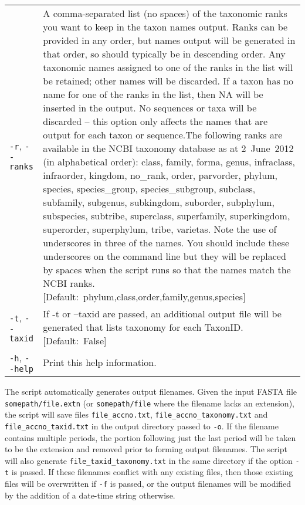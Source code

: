 \documentclass[11pt]{amsart}
\begin{document}
\begin{longtable}{@{} p{1.4in} p{5.35in} @{}}
      \verb|-r|, \verb|--ranks|  & A comma-separated list (no spaces) of the taxonomic ranks you want to keep in the taxon names output. Ranks can be provided in any order, but names output will be generated in that order, so should typically be in descending order. Any taxonomic names assigned to one of the ranks in the list will be retained; other names will be discarded. If a taxon has no name for one of the ranks in the list, then NA will be inserted in the output. No sequences or taxa will be discarded -- this option only affects the names that are output for each taxon or sequence.The following ranks are available in the NCBI taxonomy database as at 2~June~2012 (in alphabetical order): class, family, forma, genus, \mbox{infraclass}, \mbox{infraorder}, kingdom, no\_rank, order, parvorder, phylum, species, species\_group, species\_subgroup, subclass, subfamily, subgenus, \mbox{subkingdom}, \mbox{suborder}, \mbox{subphylum}, subspecies, subtribe, superclass, superfamily, \mbox{superkingdom}, \mbox{superorder}, superphylum, tribe, varietas. Note the use of underscores in three of the names. You should include these underscores on the command line but they will be replaced by spaces when the script runs so that the names match the NCBI ranks. \mbox{[Default:~phylum,class,order,family,genus,species]} \\
      \verb|-t|, \verb|--taxid| & If -t or --taxid are passed, an additional output file will be generated that lists taxonomy for each TaxonID.  \mbox{[Default:~False]}	\\
      \verb|-h|, \verb|--help| & Print this help information.
\end{longtable}

The script automatically generates output filenames. Given the input FASTA file \verb|somepath/file.extn| (or \verb|somepath/file| where the filename lacks an extension), the script will save files \verb|file_accno.txt|, \verb|file_accno_taxonomy.txt| and \verb|file_accno_taxid.txt| in the output directory passed to \verb|-o|. If the filename contains multiple periods, the portion following just the last period will be taken to be the extension and removed prior to forming output filenames. The script will also generate \verb|file_taxid_taxonomy.txt| in the same directory if the option \verb|-t| is passed. If these filenames conflict with any existing files, then those existing files will be overwritten if \verb|-f| is passed, or the output filenames will be modified by the addition of a date-time string otherwise.
\end{document}
